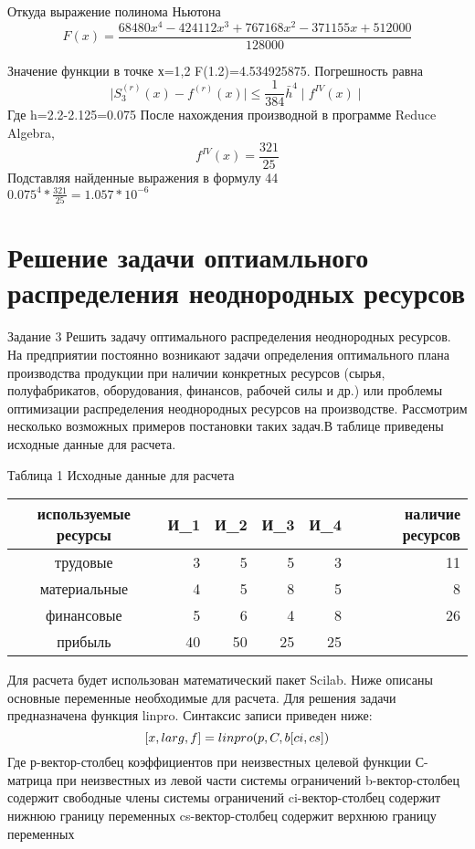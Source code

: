 \documentclass[russian,utf8,nocolumnxxxi,nocolumnxxxii]{eskdtext}
\begin{document}
Откуда выражение полинома Ньютона 
\begin{equation}
F(x)=\frac{68480 {{x}^{4}}-424112 {{x}^{3}}+767168 {{x}^{2}}-371155 x+512000}{128000}
\end{equation}

Значение функции в точке х=1,2 F(1.2)=4.534925875.
Погрешность равна
\begin{equation}
\mid S^{(r)}_3(x) - f^{(r)}(x) \mid \leqslant \frac{1}{384} \bar{h}^4 \mid f^{IV}(x)\mid
\end{equation} 
Где h=2.2-2.125=0.075
После нахождения производной в программе Reduce Algebra,
\begin{equation}
f^{IV}(x)=\frac{321}{25}
\end{equation} 
Подставляя найденные выражения в формулу 44\\

$0.075^4 * \frac{321}{25}=1.057*10^{-6} $

\newpage

\section{Решение задачи оптиамльного распределения неоднородных ресурсов}
Задание 3
Решить задачу оптимального распределения неоднородных ресурсов. На предприятии постоянно возникают задачи определения
оптимального плана производства продукции при наличии конкретных ресурсов (сырья, полуфабрикатов, оборудования, финансов, рабочей силы и др.) или проблемы оптимизации распределения неоднородных ресурсов на производстве. Рассмотрим несколько возможных примеров постановки таких задач.В таблице приведены исходные данные для расчета.

Таблица 1 Исходные данные для расчета

\begin{tabular}{|c|r|r|r|r|r|}
\hline
используемые ресурсы & И_1 & И_2 & И_3 & И_4 & наличие ресурсов \\
\hline
трудовые & 3 & 5 & 5 & 3 & 11 \\
\hline
материальные & 4 & 5 & 8 & 5 & 8 \\
\hline
финансовые & 5 & 6 & 4 & 8 & 26 \\
\hline
прибыль & 40 & 50 & 25 & 25 &  \\
\hline
\end{tabular}

Для расчета будет использован математический пакет Scilab. Ниже описаны основные переменные необходимые для расчета.
Для решения задачи предназначена функция linpro. Синтаксис записи приведен ниже:
\begin{equation}
$$[x,larg,f]=linpro(p,C,b[ci,cs])$$
\end{equation}
Где р-вектор-столбец коэффициентов при неизвестных целевой функции
С-матрица при неизвестных из левой части системы ограничений
b-вектор-столбец содержит свободные члены системы ограничений
ci-вектор-столбец содержит нижнюю границу переменных
cs-вектор-столбец содержит верхнюю границу переменных
\end{document}
